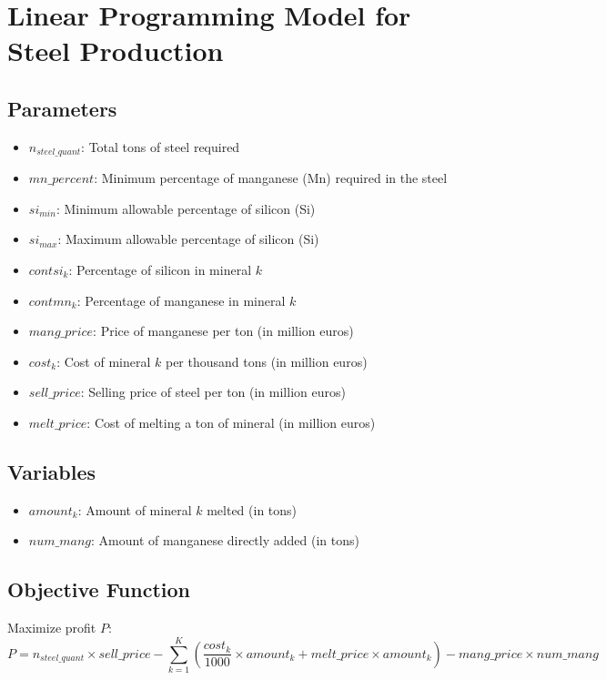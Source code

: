 \documentclass{article}
\begin{document}
\section*{Linear Programming Model for Steel Production}

\subsection*{Parameters}
\begin{itemize}
    \item \( n_{steel\_quant} \): Total tons of steel required
    \item \( mn\_percent \): Minimum percentage of manganese (Mn) required in the steel
    \item \( si_{min} \): Minimum allowable percentage of silicon (Si)
    \item \( si_{max} \): Maximum allowable percentage of silicon (Si)
    \item \( contsi_k \): Percentage of silicon in mineral \( k \)
    \item \( contmn_k \): Percentage of manganese in mineral \( k \)
    \item \( mang\_price \): Price of manganese per ton (in million euros)
    \item \( cost_k \): Cost of mineral \( k \) per thousand tons (in million euros)
    \item \( sell\_price \): Selling price of steel per ton (in million euros)
    \item \( melt\_price \): Cost of melting a ton of mineral (in million euros)
\end{itemize}

\subsection*{Variables}
\begin{itemize}
    \item \( amount_k \): Amount of mineral \( k \) melted (in tons)
    \item \( num\_mang \): Amount of manganese directly added (in tons)
\end{itemize}

\subsection*{Objective Function}
Maximize profit \( P \):
\[
P = n_{steel\_quant} \times sell\_price - \sum_{k=1}^{K} \left( \frac{cost_k}{1000} \times amount_k + melt\_price \times amount_k \right) - mang\_price \times num\_mang
\]
\end{document}
